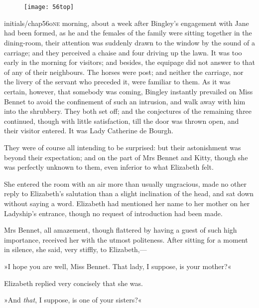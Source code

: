 \chapter[Chapter \thechapter]{}
	
	
\begin{figure}[t!]
\centering
\texttt{[image: 56top]}
\end{figure}


\lettrine[lines=6,image=true]{initials/chap56o}{ne}  morning, about a week after Bingley's engagement with Jane had been formed, as he and the females of the family were sitting together in the dining-room, their attention was suddenly drawn to the window by the sound of a carriage; and they perceived a chaise and four driving up the lawn. It was too early in the morning for visitors; and besides, the equipage did not answer to that of any of their neighbours. The horses were post; and neither the carriage, nor the livery of the servant who preceded it, were familiar to them. As it was certain, however, that somebody was coming, Bingley instantly prevailed on Miss Bennet to avoid the confinement of such an intrusion, and walk away with him into the shrubbery. They both set off; and the conjectures of the remaining three continued, though with little satisfaction, till the door was thrown open, and their visitor entered. It was Lady Catherine de Bourgh.

They were of course all intending to be surprised: but their astonishment was beyond their expectation; and on the part of Mrs Bennet and Kitty, though she was perfectly unknown to them, even inferior to what Elizabeth felt.

She entered the room with an air more than usually ungracious, made no other reply to Elizabeth's salutation than a slight inclination of the head, and sat down without saying a word. Elizabeth had mentioned her name to her mother on her Ladyship's entrance, though no request of introduction had been made.

Mrs Bennet, all amazement, though flattered by having a guest of such high importance, received her with the utmost politeness. After sitting for a moment in silence, she said, very stiffly, to Elizabeth,—

»I hope you are well, Miss Bennet. That lady, I suppose, is your mother?«

Elizabeth replied very concisely that she was.

»And \textit{that}, I suppose, is one of your sisters?«

